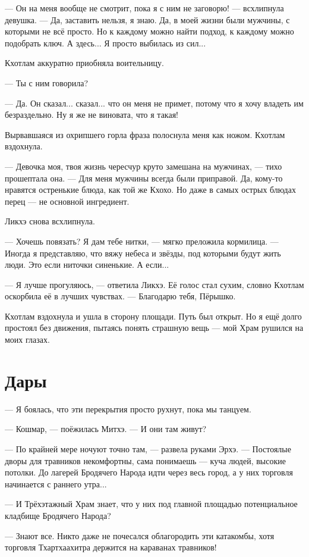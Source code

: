 --- Он на меня вообще не смотрит, пока я с ним не заговорю! --- всхлипнула девушка.
--- Да, заставить нельзя, я знаю.
Да, в моей жизни были мужчины, с которыми не всё просто.
Но к каждому можно найти подход, к каждому можно подобрать ключ.
А здесь...
Я просто выбилась из сил...

Кхотлам аккуратно приобняла воительницу.

--- Ты с ним говорила?

--- Да.
Он сказал... сказал... что он меня не примет, потому что я хочу владеть им безраздельно.
Ну я же не виновата, что я такая!

Вырвавшаяся из охрипшего горла фраза полоснула меня как ножом.
Кхотлам вздохнула.

--- Девочка моя, твоя жизнь чересчур круто замешана на мужчинах, --- тихо прошептала она.
--- Для меня мужчины всегда были приправой.
Да, кому-то нравятся остренькие блюда, как той же Кхохо.
Но даже в самых острых блюдах перец --- не основной ингредиент.

Ликхэ снова всхлипнула.

--- Хочешь повязать?
Я дам тебе нитки, --- мягко преложила кормилица.
--- Иногда я представляю, что вяжу небеса и звёзды, под которыми будут жить люди.
Это если ниточки синенькие.
А если...

--- Я лучше прогуляюсь, --- ответила Ликхэ.
Её голос стал сухим, словно Кхотлам оскорбила её в лучших чувствах.
--- Благодарю тебя, Пёрышко.

Кхотлам вздохнула и ушла в сторону площади.
Путь был открыт.
Но я ещё долго простоял без движения, пытаясь понять страшную вещь --- мой Храм рушился на моих глазах.

\section{Дары}

--- Я боялась, что эти перекрытия просто рухнут, пока мы танцуем.

--- Кошмар, --- поёжилась Митхэ.
--- И они там живут?

--- По крайней мере ночуют точно там, --- развела руками Эрхэ.
--- Постоялые дворы для травников некомфортны, сама понимаешь --- куча людей, высокие потолки.
До лагерей Бродячего Народа идти через весь город, а у них торговля начинается с раннего утра...

--- И Трёхэтажный Храм знает, что у них под главной площадью потенциальное кладбище Бродячего Народа?

--- Знают все.
Никто даже не почесался облагородить эти катакомбы, хотя торговля Тхартхаахитра держится на караванах травников!

